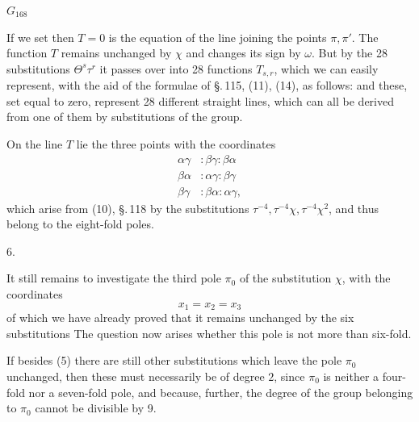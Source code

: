  $G_{168}$

If we set
then $T = 0$ is the equation of the line joining the points $\pi, \pi'$. The function $T$ remains unchanged by $\chi$ and changes its sign by $\omega$. But by the 28 substitutions $\Theta^s\tau^r$ it passes over into 28  functions $T_{s,r}$, which we can easily represent, with the aid of the formulae of \S.\,115, (11), (14), as follows:
and these, set equal to zero, represent 28 different straight lines, which can all be derived from one of them by substitutions of the group.

On the line $T$ lie the three points with the coordinates
\[
\begin{aligned}
\alpha\gamma &: \beta\gamma : \beta\alpha \\
\beta\alpha &: \alpha\gamma : \beta\gamma \\
\beta\gamma &: \beta\alpha : \alpha\gamma,
\end{aligned}
\]
which arise from (10), \S.\,118 by the substitutions $\tau^{-4}, \tau^{-4}\chi, \tau^{-4}\chi^2$, and thus belong to the eight-fold poles.

6. 

It still remains to investigate the third pole $\pi_0$ of the substitution $\chi$, with the coordinates
\[
x_1 = x_2 = x_3
\]
of which we have already proved that it remains unchanged by the six substitutions
The question now arises whether this pole is not more than six-fold.

If besides (5) there are still other substitutions which leave the pole $\pi_0$ unchanged, then these must necessarily be of degree $2$, since $\pi_0$ is neither a four-fold nor a seven-fold pole, and because, further, the degree of the group belonging to $\pi_0$ cannot be divisible by 9.
